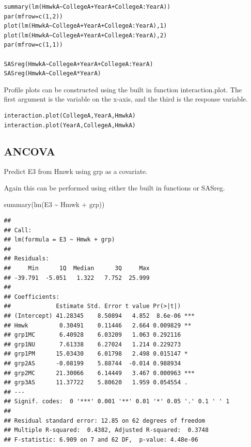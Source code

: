 \documentclass[
]{book}
\newenvironment{Shaded}{\begin{snugshade}}{\end{snugshade}}
\newcommand{\FunctionTok}[1]{\textcolor[rgb]{0.00,0.00,0.00}{#1}}
\newcommand{\NormalTok}[1]{#1}
\newcommand{\SpecialCharTok}[1]{\textcolor[rgb]{0.00,0.00,0.00}{#1}}
\begin{document}
\begin{verbatim}
summary(lm(HmwkA~CollegeA+YearA+CollegeA:YearA))
par(mfrow=c(1,2))
plot(lm(HmwkA~CollegeA+YearA+CollegeA:YearA),1)
plot(lm(HmwkA~CollegeA+YearA+CollegeA:YearA),2)
par(mfrow=c(1,1))

SASreg(HmwkA~CollegeA+YearA+CollegeA:YearA)
SASreg(HmwkA~CollegeA*YearA)
\end{verbatim}

Profile plots can be constructed using the built in function interaction.plot. The first argument is the variable on the x-axis, and the third is the response variable.

\begin{verbatim}
interaction.plot(CollegeA,YearA,HmwkA)
interaction.plot(YearA,CollegeA,HmwkA)
\end{verbatim}

\hypertarget{ancova}{%
\subsection{ANCOVA}\label{ancova}}

Predict E3 from Hmwk using grp as a covariate.

Again this can be performed using either the built in functions or SASreg.

\begin{Shaded}
\begin{Highlighting}[]
\FunctionTok{summary}\NormalTok{(}\FunctionTok{lm}\NormalTok{(E3 }\SpecialCharTok{\textasciitilde{}}\NormalTok{ Hmwk }\SpecialCharTok{+}\NormalTok{ grp))}
\end{Highlighting}
\end{Shaded}

\begin{verbatim}
## 
## Call:
## lm(formula = E3 ~ Hmwk + grp)
## 
## Residuals:
##     Min      1Q  Median      3Q     Max 
## -39.791  -5.051   1.322   7.752  25.999 
## 
## Coefficients:
##             Estimate Std. Error t value Pr(>|t|)    
## (Intercept) 41.28345    8.50894   4.852  8.6e-06 ***
## Hmwk         0.30491    0.11446   2.664 0.009829 ** 
## grp1MC       6.40928    6.03209   1.063 0.292116    
## grp1NU       7.61338    6.27024   1.214 0.229273    
## grp1PM      15.03430    6.01798   2.498 0.015147 *  
## grp2AS      -0.08199    5.88744  -0.014 0.988934    
## grp2MC      21.30066    6.14449   3.467 0.000963 ***
## grp3AS      11.37722    5.80620   1.959 0.054554 .  
## ---
## Signif. codes:  0 '***' 0.001 '**' 0.01 '*' 0.05 '.' 0.1 ' ' 1
## 
## Residual standard error: 12.85 on 62 degrees of freedom
## Multiple R-squared:  0.4382, Adjusted R-squared:  0.3748 
## F-statistic: 6.909 on 7 and 62 DF,  p-value: 4.48e-06
\end{verbatim}
\end{document}
